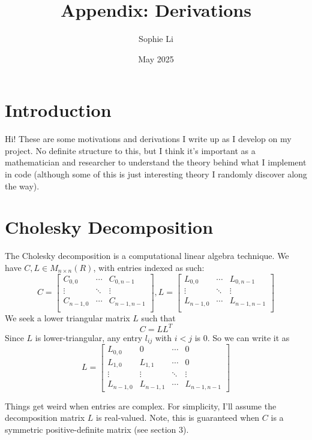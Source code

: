 \documentclass{article}
\title{Appendix: Derivations}
\author{Sophie Li }
\date{May 2025}
\begin{document}
\maketitle

\section{Introduction}
Hi! These are some motivations and derivations I write up as I develop on my project. No definite structure to this, but I think it's important as a mathematician and researcher to understand the theory behind what I implement in code (although some of this is just interesting theory I randomly discover along the way). 

\section{Cholesky Decomposition}
The Cholesky decomposition is a computational linear algebra technique. 
We have $C,L \in M_{n \times n}(R)$, with entries indexed as such: 
$$ C = \begin{bmatrix}
C_{0,0} & \cdots & C_{0,n-1} \\
\vdots & \ddots & \vdots \\
C_{n-1,0} & \cdots & C_{n-1,n-1} \\
\end{bmatrix}, L = \begin{bmatrix}
L_{0,0} & \cdots & L_{0,n-1} \\
\vdots & \ddots & \vdots \\
L_{n-1,0} & \cdots & L_{n-1,n-1} \\
\end{bmatrix}
$$
We seek a lower triangular matrix $L$ such that 
$$ C = LL^T$$
Since $L$ is lower-triangular, any entry $l_{ij}$ with $i < j$ is 0. So we can write it as 
$$ L = \begin{bmatrix}
L_{0,0} & 0        & \cdots & 0 \\
L_{1,0} & L_{1,1}  & \cdots & 0 \\
\vdots  & \vdots   & \ddots & \vdots \\
L_{n-1,0} & L_{n-1,1} & \cdots & L_{n-1,n-1}
\end{bmatrix}$$

\noindent Things get weird when entries are complex. For simplicity, I'll assume the decomposition matrix $L$ is real-valued. Note, this is guaranteed when $C$ is a symmetric positive-definite matrix (see section 3). \bigskip
\end{document}
